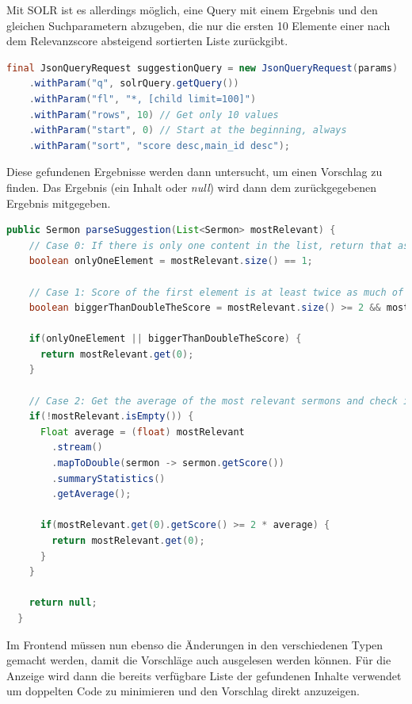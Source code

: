 Mit SOLR ist es allerdings möglich, eine Query mit einem Ergebnis und den gleichen Suchparametern abzugeben, die nur die ersten 10 Elemente einer nach dem Relevanzscore absteigend sortierten Liste zurückgibt.

\clearpage
\begin{lstlisting}[language=Java, label={code:SOLRSuggestionQuery}, title={SOLR Query für die Top 10 Ergebnisse, absteigend sortiert nach Relevanz \cite{solr-search2022}}]
  final JsonQueryRequest suggestionQuery = new JsonQueryRequest(params)
    .withParam("q", solrQuery.getQuery())
    .withParam("fl", "*, [child limit=100]")
    .withParam("rows", 10) // Get only 10 values
    .withParam("start", 0) // Start at the beginning, always
    .withParam("sort", "score desc,main_id desc");
\end{lstlisting}

Diese gefundenen Ergebnisse werden dann untersucht, um einen Vorschlag zu finden. Das Ergebnis (ein Inhalt oder \emph{null}) wird dann dem zurückgegebenen Ergebnis mitgegeben.

\begin{lstlisting}[language=Java, label={code:parseSuggestion}, title={Relevanteste Inhalte nach einem Vorschlag durchsuchen \cite{solr-search2022}}]
  public Sermon parseSuggestion(List<Sermon> mostRelevant) {
    // Case 0: If there is only one content in the list, return that as suggestion
    boolean onlyOneElement = mostRelevant.size() == 1;

    // Case 1: Score of the first element is at least twice as much of the second score
    boolean biggerThanDoubleTheScore = mostRelevant.size() >= 2 && mostRelevant.get(0).getScore() >= 2 * mostRelevant.get(1).getScore();

    if(onlyOneElement || biggerThanDoubleTheScore) {
      return mostRelevant.get(0);
    }

    // Case 2: Get the average of the most relevant sermons and check if the first has at least twice as much of that
    if(!mostRelevant.isEmpty()) {
      Float average = (float) mostRelevant
        .stream()
        .mapToDouble(sermon -> sermon.getScore())
        .summaryStatistics()
        .getAverage();

      if(mostRelevant.get(0).getScore() >= 2 * average) {
        return mostRelevant.get(0);
      }
    }

    return null;
  }
\end{lstlisting}


\clearpage
Im Frontend müssen nun ebenso die Änderungen in den verschiedenen Typen gemacht werden, damit die Vorschläge auch ausgelesen werden können.
Für die Anzeige wird dann die bereits verfügbare Liste der gefundenen Inhalte verwendet um doppelten Code zu minimieren und den Vorschlag direkt anzuzeigen.


